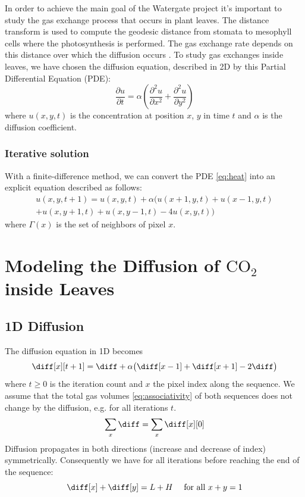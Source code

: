 In order to achieve the main goal of the Watergate project it's important to study the
gas exchange process that occurs in plant leaves. The distance transform is used to
compute the geodesic distance from stomata to mesophyll cells where the photosynthesis
is performed. The gas exchange rate depends on this distance over which the diffusion 
occurs \cite{RSB}. To study gas exchanges inside leaves, we have chosen the diffusion
equation, described in 2D by this Partial Differential Equation (PDE):
%
\begin{equation}
  \frac{\partial u}{\partial t} = \alpha \left( \frac{\partial^2u}{\partial x^2} + \frac{\partial^2u}{\partial y^2} \right)
  \label{eq:heat}
\end{equation}
%
where $u(x,y,t)$ is the concentration at position $x$, $y$ in time $t$ and $\alpha$ is the
diffusion coefficient.

\subsubsection{Iterative solution}

With a finite-difference method, we can convert the PDE \eqref{eq:heat} into an explicit 
equation described as follows:
%
\begin{multline}
    u(x,y,t+1) = u(x,y,t) + \alpha \big(
        u(x+1,y,t) + u(x-1,y,t) \\
        + u(x,y+1,t) + u(x,y-1,t) 
        - 4 u(x,y,t)
        \big)
    \label{eq:iterative}
\end{multline}
%
where $\Gamma(x)$ is the set of neighbors of pixel $x$.

\section{Modeling the Diffusion of \texorpdfstring{$\mathrm{CO_2}$}{CO2} inside Leaves}

\subsection{1D Diffusion}

The diffusion equation in 1D becomes
%
\begin{equation}
    \diff[x][t+1] = \diff + \alpha \big(\diff[x-1] + \diff[x+1] - 2 \diff \big)
    \label{eq:1D:iterative}
\end{equation}
%
where $t \ge 0$ is the iteration count and $x$ the pixel index along the sequence. 
%
We assume that the total gas volumes \eqref{eq:associativity} of both sequences 
does not change by the diffusion, e.g. for all iterations $t$.
%
\begin{equation}\label{eq:associativity}
    \sum_x \diff = \sum_x \diff[x][0]
\end{equation}
%
Diffusion propagates in both directions (increase and decrease of index) symmetrically.
Consequently we have for all iterations before reaching the end of the sequence:
%
\begin{equation}\label{eq:symmetry}
    \diff[x] + \diff[y] = L+H \quad \mbox{ for all } x+y=1
\end{equation}

